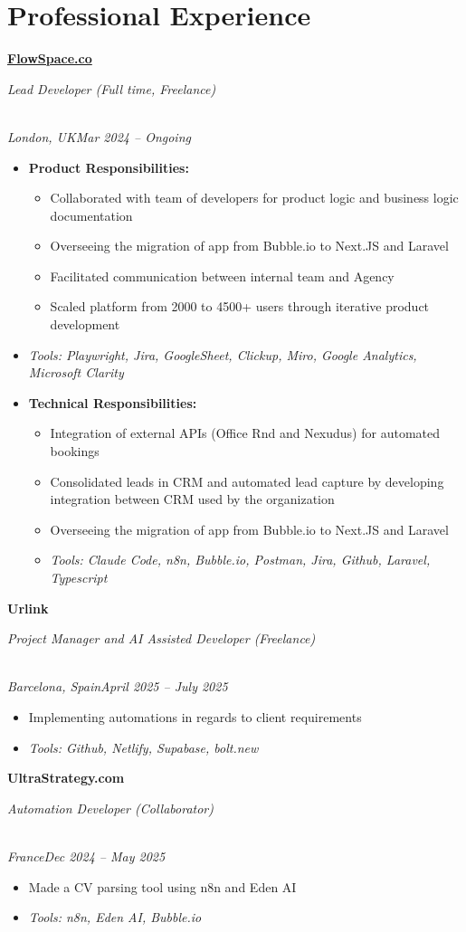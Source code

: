 \documentclass[a4paper,10pt]{article}
\newcommand{\role}[4]{\vspace{3pt}\noindent\hspace{0.6em}\parbox[t]{0.38\textwidth}{\raggedright\textbf{#1}}\hfill\parbox[t]{0.58\textwidth}{\raggedleft\textit{#2}}\\{\textit{#3}\hfill\textit{#4}}\vspace{1pt}}
\begin{document}
\section{Professional Experience}
\role{\href{https://flowspace.co}{FlowSpace.co}}{Lead Developer (Full time, Freelance)}{London, UK}{Mar 2024 -- Ongoing}
\begin{itemize}
\item \textbf{Product Responsibilities:}
\begin{itemize}[label=--]
\item Collaborated with team of developers for product logic and business logic documentation
\item Overseeing the migration of app from Bubble.io to Next.JS and Laravel
\item Facilitated communication between internal team and Agency
\item Scaled platform from 2000 to 4500+ users through iterative product development
\end{itemize}
\item \textit{Tools: Playwright, Jira, GoogleSheet, Clickup, Miro, Google Analytics, Microsoft Clarity}
\item \textbf{Technical Responsibilities:}
\begin{itemize}[label=--]
\item Integration of external APIs (Office Rnd and Nexudus) for automated bookings
\item Consolidated leads in CRM and automated lead capture by developing integration between CRM used by the organization
\item Overseeing the migration of app from Bubble.io to Next.JS and Laravel
\item \textit{Tools: Claude Code, n8n, Bubble.io, Postman, Jira, Github, Laravel, Typescript}
\end{itemize}
\end{itemize}

\role{Urlink}{Project Manager and AI Assisted Developer (Freelance)}{Barcelona, Spain}{April 2025 -- July 2025}
\begin{itemize}
\item Implementing automations in regards to client requirements
\item \textit{Tools: Github, Netlify, Supabase, bolt.new}
\end{itemize}

\role{UltraStrategy.com}{Automation Developer (Collaborator)}{France}{Dec 2024 -- May 2025}
\begin{itemize}
\item Made a CV parsing tool using n8n and Eden AI
\item \textit{Tools: n8n, Eden AI, Bubble.io}
\end{itemize}
\end{document}
